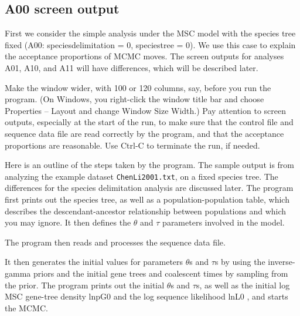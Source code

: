 \documentclass[a4paper]{book}
\numberwithin{equation}{section} \renewcommand{\baselinestretch}{0.55}
\begin{document}
\subsection{A00 screen output}

First we consider the simple analysis under the MSC model with the
species tree fixed (A00: speciesdelimitation = 0, speciestree = 0).
We use this case to explain the acceptance proportions of MCMC moves.
The screen outputs for analyses A01, A10, and A11 will have
differences, which will be described later.

Make the window wider, with 100 or 120 columns, say, before you run
the program.  (On Windows, you right-click the window title bar and
choose Properties – Layout and change Window Size Width.)  Pay
attention to screen outputs, especially at the start of the run, to
make sure that the control file and sequence data file are read
correctly by the program, and that the acceptance proportions are
reasonable.  Use Ctrl-C to terminate the run, if needed.

Here is an outline of the steps taken by the program.  The sample
output is from analyzing the example dataset \texttt{ChenLi2001.txt},
on a fixed species tree.  The differences for the species delimitation
analysis are discussed later.  The program first prints out the
species tree, as well as a population-population table, which
describes the descendant-ancestor relationship between populations and
which you may ignore.  It then defines the $\theta$ and $\tau$
parameters involved in the model.

The program then reads and processes the sequence data file.

It then generates the initial values for parameters $\theta$s and
$\tau$s by using the inverse-gamma priors and the initial gene trees
and coalescent times by sampling from the prior.  The program prints
out the initial $\theta$s and $\tau$s, as well as the initial log MSC
gene-tree density lnpG0 \citep{Rannala2003} and the log sequence
likelihood lnL0 \citep{Felsenstein1981}, and starts the MCMC.
\end{document}

